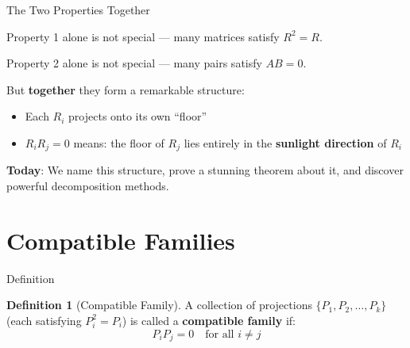 \documentclass[10pt]{beamer}
\theoremstyle{definition}
\newtheorem{defi}{Definition}[section]
\newcommand{\x}[1]{\alert{\textbf{#1}}}
\begin{document}
\begin{frame}{The Two Properties Together}

Property 1 alone is not special --- many matrices satisfy $R^2 = R$.

\vspace{0.5em}

Property 2 alone is not special --- many pairs satisfy $AB = 0$.

\vspace{0.5em}

But \x{together} they form a remarkable structure:

\vspace{0.5em}

\begin{itemize}
\item Each $R_i$ projects onto its own ``floor''
\item $R_i R_j = 0$ means: the floor of $R_j$ lies entirely in the \x{sunlight direction} of $R_i$
\end{itemize}

\vspace{0.5em}

\x{Today}: We name this structure, prove a stunning theorem about it, and discover powerful decomposition methods.

\end{frame}


\section{Compatible Families}

\begin{frame}{Definition}

\begin{defi}[Compatible Family]
A collection of projections $\{P_1, P_2, \ldots, P_k\}$ (each satisfying $P_i^2 = P_i$) is called a \x{compatible family} if:
$$P_i P_j = 0 \quad \text{for all } i \neq j$$
\end{defi}

\end{frame}
\end{document}
